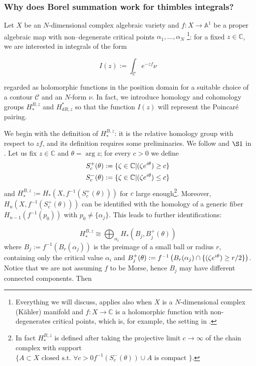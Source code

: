 \documentclass{article}
\let\Re\relax
\DeclareMathOperator{\Re}{Re}
\theoremstyle{definition}
\newcommand{\C}{\mathbb{C}}
\begin{document}
\color{black}

\subsubsection{Why does Borel summation work for thimbles integrals?}

Let $X$ be an $N$-dimensional complex algebraic variety and $f\colon X\to\mathbb{A}^1$ be a proper algebraic map with non--degenerate critical points $\alpha_1,...,\alpha_N$ \footnote{Everything we will discuss, applies also when $X$ is a $N$-dimensional complex (K\"ahler) manifold and $f\colon X\to\C$ is a holomorphic function with non-degenerates critical points, which is, for example, the setting in \cite{Witten}.}: for a fixed $z\in\C$, we are interested in integrals of the form 

\[
I(z):=\int_{\mathcal{C}}e^{-zf}\nu
\]

regarded as holomorphic functions in the position domain for a suitable choice of a contour $\mathcal{C}$ and an $N$-form $\nu$. In fact, we introduce homology and cohomology groups $H_{*}^{B,z}$ and $H_{dR,z}^*$ so that the function $I(z)$ will represent the Poincar\'e pairing. 

We begin with the definition of $H_{*}^{B,z}$: it is the relative homology group with respect to $zf$, and its definition requires some preliminaries. We follow \cite{pham} and $\S 1$ in \cite{Arnold}. Let us fix $z\in\C$ and $\theta=\arg z$; for every $c>0$ we define 
\begin{align*}
    S_c^+(\theta) &:=\lbrace \zeta\in\C \vert \Re (\zeta e^{i\theta})\geq c \rbrace\\
    S_c^-(\theta)&:=\lbrace \zeta\in\C \vert \Re (\zeta e^{i\theta})\leq c \rbrace
\end{align*}
and $H_{*}^{B,z}:=H_{*}(X,f^{-1}(S_c^+(\theta)))$ for $c$ large enough\footnote{In fact $H_{*}^{B,z}$ is defined after taking the projective limit $c\to\infty$ of the chain complex with support $\{A\subset X \text{ closed s.t. } \forall c>0 f^{-1}(S_c^-(\theta))\cup A \text{ is compact }  \}$.}. Moreover, $H_n(X,f^{-1}(S_c^+(\theta)))$ can be identified with the homology of a generic fiber $H_{n-1}(f^{-1}(p_0))$ with $p_0\neq \{\alpha_j\}$. This leads to further identifications:

\begin{equation}
    H_{*}^{B,z}\cong \bigoplus_{\alpha_i} H_{*}(B_j, B_j^+(\theta))
\end{equation}
where $B_j:=f^{-1}(B_r(\alpha_j))$ is the preimage of a small ball or radius $r$, containing only the critical value $\alpha_i$ and $B_j^+(\theta):=f^{-1}\left(B_r(\alpha_j)\cap \{ \Re (\zeta e^{i\theta})\geq r/2\}\right)$. Notice that we are not assuming $f$ to be Morse, hence $B_j$ may have different connected components. Then 
\end{document}
